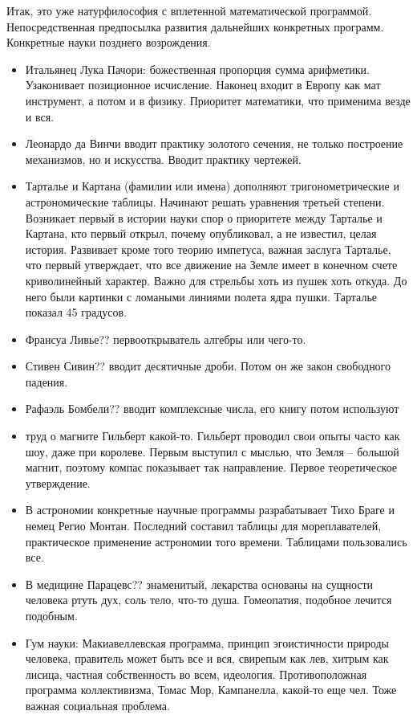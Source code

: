 \documentclass[a4paper, 12pt]{article}
\begin{document}
Итак, это уже натурфилософия с вплетенной математической программой. 
Непосредственная предпосылка развития дальнейших конкретных программ. 
Конкретные науки позднего возрождения.
\begin{itemize}
  \item Итальянец Лука Пачори: божественная пропорция сумма арифметики. 
    Узаконивает позиционное исчисление. Наконец входит в Европу как мат 
    инструмент, а потом и в физику. Приоритет математики, что применима 
    везде и вся.
  \item Леонардо да Винчи вводит практику золотого сечения, не только 
    построение механизмов, но и искусства. Вводит практику чертежей.
  \item Тарталье и Картана (фамилии или имена) дополняют 
    тригонометрические и астрономические таблицы. Начинают решать 
    уравнения третьей степени. Возникает первый в истории науки спор 
    о приоритете между Тарталье и Картана, кто первый открыл, почему 
    опубликовал, а не известил, целая история. Развивает кроме того 
    теорию импетуса, важная заслуга Тарталье, что первый утверждает, что 
    все движение на Земле имеет в конечном счете криволинейный характер. 
    Важно для стрельбы хоть из пушек хоть откуда. До него были картинки 
    с ломаными линиями полета ядра пушки. Тарталье показал 45 градусов.
  \item Франсуа Ливье?? первооткрыватель алгебры или чего-то.
  \item Стивен Сивин?? вводит десятичные дроби. Потом он же закон 
    свободного падения.
  \item Рафаэль Бомбели?? вводит комплексные числа, его книгу потом 
    используют
  \item труд о магните Гильберт какой-то. Гильберт проводил свои опыты 
    часто как шоу, даже при королеве. Первым выступил с мыслью, что 
    Земля -- большой магнит, поэтому компас показывает так направление. 
    Первое теоретическое утверждение.
  \item В астрономии конкретные научные программы разрабатывает Тихо 
    Браге и немец Регио Монтан. Последний составил таблицы для 
    мореплавателей, практическое применение астрономии того времени. 
    Таблицами пользовались все.
  \item В медицине Парацевс?? знаменитый, лекарства основаны на сущности 
    человека ртуть дух, соль тело, что-то душа. Гомеопатия, подобное 
    лечится подобным.
  \item Гум науки: Макиавеллевская программа, принцип эгоистичности 
    природы человека, правитель может быть все и вся, свирепым как лев, 
    хитрым как лисица, частная собственность во всем, идеология. 
    Противоположная программа коллективизма, Томас Мор, Кампанелла, 
    какой-то еще чел. Тоже важная социальная проблема.
\end{itemize}
\end{document}
